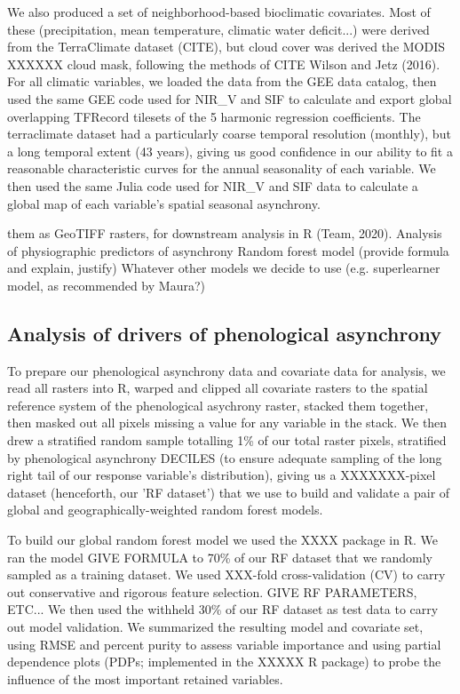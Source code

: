 \documentclass[12pt]{article}
\begin{document}
We also produced a set of neighborhood-based bioclimatic covariates.
Most of these (precipitation, mean temperature, climatic water deficit...) were derived from the TerraClimate dataset (CITE),
but cloud cover was derived the MODIS XXXXXX cloud mask, following
the methods of CITE Wilson and Jetz (2016).
For all climatic variables, we loaded the data from the GEE data catalog,
then used the same GEE code used for NIR_{V} and SIF to calculate
and export global overlapping TFRecord tilesets of the 5 harmonic regression
coefficients. The terraclimate dataset had a particularly coarse temporal resolution (monthly), but a long temporal extent (43 years), giving us good confidence in our ability to fit a reasonable characteristic curves for the annual seasonality of each variable.
We then used the same Julia code used for NIR_{V} and SIF data to calculate
a global map of each variable's spatial seasonal asynchrony.

them as GeoTIFF rasters, for downstream analysis in R (Team, 2020).
Analysis of physiographic predictors of asynchrony
Random forest model (provide formula and explain, justify)
Whatever other models we decide to use (e.g. superlearner model, as
recommended by Maura?)


\subsection*{Analysis of drivers of phenological asynchrony}

To prepare our phenological asynchrony data and covariate data for analysis, we read all
rasters into R, warped and clipped all covariate rasters to the
spatial reference system of the phenological asychrony raster, stacked them together,
then masked out all pixels missing a value for any variable in the stack.
We then drew a stratified random sample totalling 1\% of our total raster pixels,
stratified by phenological asynchrony DECILES (to ensure adequate sampling of
the long right tail of our response variable's distribution), giving us
a XXXXXXX-pixel dataset (henceforth, our 'RF dataset') that we use to build and validate a pair of global
and geographically-weighted random forest models.

To build our global random forest model we used the XXXX package in R. We ran
the model 
        GIVE FORMULA
to 70\% of our RF dataset that we randomly sampled as a training dataset.
We used XXX-fold cross-validation (CV) to carry out conservative and rigorous
feature selection. GIVE RF PARAMETERS, ETC... We then used the withheld 30\% of our
RF dataset as test data to carry out model validation. We summarized the resulting model
and covariate set, using RMSE and percent purity to assess variable
importance and using partial dependence plots (PDPs; implemented in the XXXXX R package)
to probe the influence of the most important retained variables.
\end{document}
